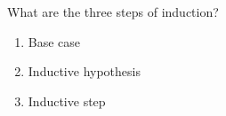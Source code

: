 \question What are the three steps of induction?

\begin{solution}[2in]
\begin{enumerate}
\item Base case
\item Inductive hypothesis
\item Inductive step
\end{enumerate}
\end{solution}